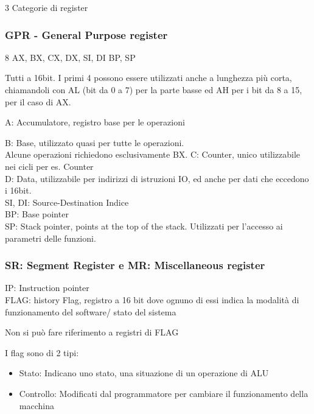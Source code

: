 \documentclass{article}
\begin{document}
3 Categorie di register

\subsubsection{GPR - General Purpose register}
8 AX, BX, CX, DX, SI, DI BP, SP


Tutti a 16bit. I primi 4 possono essere utilizzati anche a lunghezza più corta, chiamandoli con AL (bit da 0 a 7) per la parte basse ed AH per i bit da 8 a 15, per il caso di AX.

A: Accumulatore, registro base per le operazioni

B: Base, utilizzato quasi per tutte le operazioni.
\\
Alcune operazioni richiedono esclusivamente BX.
C: Counter, unico utilizzabile nei cicli per es. Counter
\\
D: Data, utilizzabile per indirizzi di istruzioni IO, ed anche per dati che eccedono i 16bit.
\\
SI, DI: Source-Destination Indice
\\
BP: Base pointer
\\
SP: Stack pointer, points at the top of the stack. Utilizzati per l'accesso ai parametri delle funzioni.

\subsubsection{SR: Segment Register e MR: Miscellaneous register}
IP: Instruction pointer
\\
FLAG: history Flag, registro a 16 bit dove ognuno di essi indica la modalità di funzionamento del software/ stato del sistema

Non si può fare riferimento a registri di FLAG

I flag sono di 2 tipi:
\begin{itemize}
    \item Stato:
        Indicano uno stato, una situazione di un operazione di ALU
    \item Controllo:
        Modificati dal programmatore per cambiare il funzionamento della macchina
\end{itemize}
\end{document}
